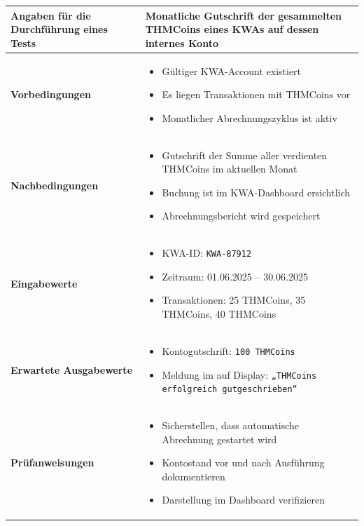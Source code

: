 \documentclass[a4paper,12pt]{article}
\begin{document}
\begin{tabular}{|p{5cm}|p{10.5cm}|}
\hline
\textbf{Angaben für die Durchführung eines Tests} & Monatliche Gutschrift der gesammelten THMCoins eines KWAs auf dessen internes Konto \\
\hline
\textbf{Vorbedingungen} & 
\begin{itemize}[leftmargin=*]
  \item Gültiger KWA-Account existiert
  \item Es liegen Transaktionen mit THMCoins vor
  \item Monatlicher Abrechnungszyklus ist aktiv
\end{itemize} \\
\hline
\textbf{Nachbedingungen} & 
\begin{itemize}[leftmargin=*]
  \item Gutschrift der Summe aller verdienten THMCoins im aktuellen Monat
  \item Buchung ist im KWA-Dashboard ersichtlich
  \item Abrechnungsbericht wird gespeichert
\end{itemize} \\
\hline
\textbf{Eingabewerte} &
\begin{itemize}[leftmargin=*]
  \item KWA-ID: \texttt{KWA-87912}
  \item Zeitraum: 01.06.2025 – 30.06.2025
  \item Transaktionen: 25 THMCoins, 35 THMCoins, 40 THMCoins
\end{itemize} \\
\hline
\textbf{Erwartete Ausgabewerte} & 
\begin{itemize}[leftmargin=*]
  \item Kontogutschrift: \texttt{100 THMCoins}
  \item Meldung im auf Display: \texttt{„THMCoins erfolgreich gutgeschrieben“}
\end{itemize} \\
\hline
\textbf{Prüfanweisungen} &
\begin{itemize}[leftmargin=*]
  \item Sicherstellen, dass automatische Abrechnung gestartet wird
  \item Kontostand vor und nach Ausführung dokumentieren
  \item Darstellung im Dashboard verifizieren
\end{itemize} \\
\hline
\end{tabular}
\end{document}
